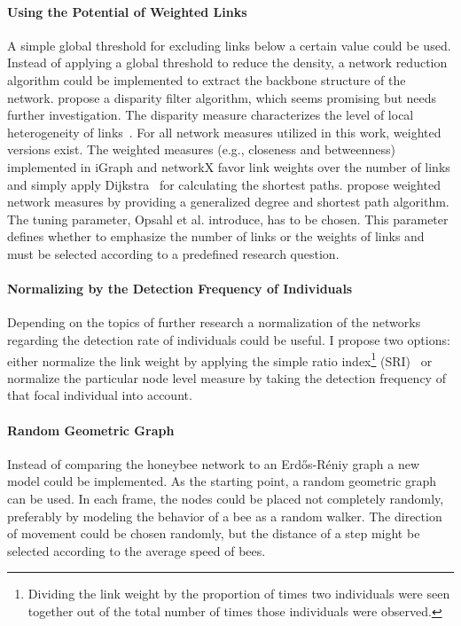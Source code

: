 \paragraph{Using the Potential of Weighted Links}
A simple global threshold for excluding links below a certain value could be used.
Instead of applying a global threshold to reduce the density, a network reduction algorithm could be implemented to extract the backbone structure of the network.
\textcite{serrano2009extracting} propose a disparity filter algorithm, which seems promising but needs further investigation.
The disparity measure characterizes the level of local heterogeneity of links~\cite{barthelemy2003spatial}.
For all network measures utilized in this work, weighted versions exist.
The weighted measures (e.g., closeness and betweenness) implemented in iGraph and networkX favor link weights over the number of links and simply apply Dijkstra~\cite{dijkstra1959note} for calculating the shortest paths. \textcite{opsahl2010node} propose weighted network measures by providing a generalized degree and shortest path algorithm. The tuning parameter, Opsahl et al. introduce, has to be chosen. This parameter defines whether to emphasize the number of links or the weights of links and must be selected according to a predefined research question.


\paragraph{Normalizing by the Detection Frequency of Individuals}
Depending on the topics of further research a normalization of the networks regarding the detection rate of individuals could be useful.
I propose two options: either normalize the link weight by applying the simple ratio index\footnote{Dividing the link weight by the proportion of times two individuals were seen together out of the total number of times those individuals were observed.} (SRI)~\cite{formica2012fitness} or normalize the particular node level measure by taking the detection frequency of that focal individual into account.

\paragraph{Random Geometric Graph}
Instead of comparing the honeybee network to an Erd\H{o}s-R\'{e}niy graph a new model could be implemented.
As the starting point, a random geometric graph~\cite{rgg2002} can be used.
In each frame, the nodes could be placed not completely randomly, preferably by modeling the behavior of a bee as a random walker.
The direction of movement could be chosen randomly, but the distance of a step might be selected according to the average speed of bees.


